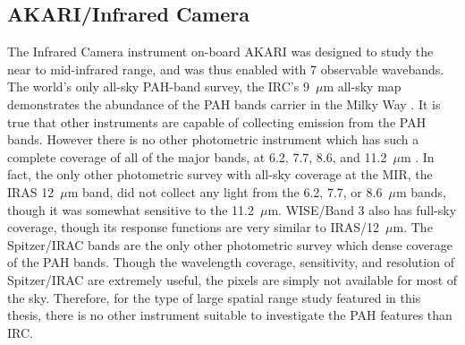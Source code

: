 \subsection{AKARI/Infrared Camera}
     The Infrared Camera instrument on-board AKARI was designed to study the near to mid-infrared range, and was thus enabled with 7 observable wavebands. The world's only all-sky PAH-band survey, the IRC's 9~$\mu$m all-sky map demonstrates the abundance of the PAH bands carrier in the Milky Way \citep{ishihara10}. It is true that other instruments are capable of collecting emission from the PAH bands. However there is no other photometric instrument which has such a complete coverage of all of the major bands, at 6.2, 7.7, 8.6, and 11.2~$\mu$m \citep{onaka99,irc07}. In fact, the only other photometric survey with all-sky coverage at the MIR, the IRAS 12~$\mu$m band, did not collect any light from the 6.2, 7.7, or 8.6~$\mu$m bands, though it was somewhat sensitive to the 11.2~$\mu$m. WISE/Band 3 also has full-sky coverage, though its response functions are very similar to IRAS/12~$\mu$m. The Spitzer/IRAC bands are the only other photometric survey which dense coverage of the PAH bands. Though the wavelength coverage, sensitivity, and resolution of Spitzer/IRAC are extremely useful, the pixels are simply not available for most of the sky. Therefore, for the type of large spatial range study featured in this thesis, there is no other instrument suitable to investigate the PAH features than IRC. 
